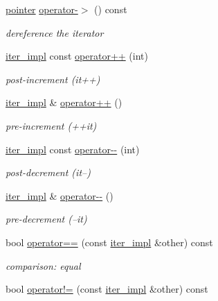\begin{DoxyCompactItemize}
\hyperlink{classnlohmann_1_1detail_1_1iter__impl_a69e52f890ce8c556fd68ce109e24b360}{pointer} \hyperlink{classnlohmann_1_1detail_1_1iter__impl_a28a0c92903edd8f86825c8c7784b0913}{operator-\/$>$} () const 
\begin{DoxyCompactList}\small\item\em dereference the iterator \end{DoxyCompactList}\item 
\hyperlink{classnlohmann_1_1detail_1_1iter__impl}{iter\+\_\+impl} const \hyperlink{classnlohmann_1_1detail_1_1iter__impl_a7d2397773b2dce42f30f0375a6a1d850}{operator++} (int)
\begin{DoxyCompactList}\small\item\em post-\/increment (it++) \end{DoxyCompactList}\item 
\hyperlink{classnlohmann_1_1detail_1_1iter__impl}{iter\+\_\+impl} \& \hyperlink{classnlohmann_1_1detail_1_1iter__impl_abdfe2a7f464400a7ab572782d14b922f}{operator++} ()
\begin{DoxyCompactList}\small\item\em pre-\/increment (++it) \end{DoxyCompactList}\item 
\hyperlink{classnlohmann_1_1detail_1_1iter__impl}{iter\+\_\+impl} const \hyperlink{classnlohmann_1_1detail_1_1iter__impl_a1fc43e764467b8ea4a4cdd01f629d757}{operator-\/-\/} (int)
\begin{DoxyCompactList}\small\item\em post-\/decrement (it--) \end{DoxyCompactList}\item 
\hyperlink{classnlohmann_1_1detail_1_1iter__impl}{iter\+\_\+impl} \& \hyperlink{classnlohmann_1_1detail_1_1iter__impl_a84e689fb581d651d130039f7cb81494a}{operator-\/-\/} ()
\begin{DoxyCompactList}\small\item\em pre-\/decrement (--it) \end{DoxyCompactList}\item 
bool \hyperlink{classnlohmann_1_1detail_1_1iter__impl_abe91c77d1be747fadcbfaf6f685e3ee7}{operator==} (const \hyperlink{classnlohmann_1_1detail_1_1iter__impl}{iter\+\_\+impl} \&other) const 
\begin{DoxyCompactList}\small\item\em comparison\+: equal \end{DoxyCompactList}\item 
bool \hyperlink{classnlohmann_1_1detail_1_1iter__impl_a66af27bbbf9743bc000264a0f89c5d0d}{operator!=} (const \hyperlink{classnlohmann_1_1detail_1_1iter__impl}{iter\+\_\+impl} \&other) const 

\end{DoxyCompactItemize}
